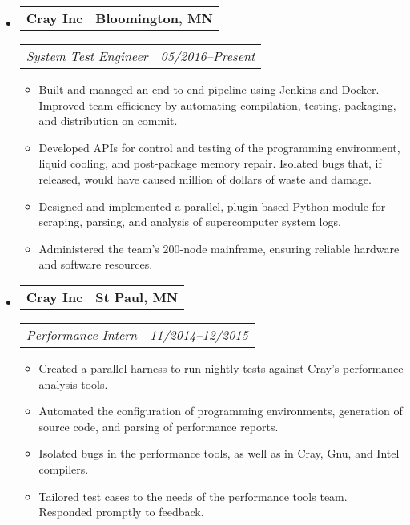 \documentclass[11pt,letterpaper]{article}
\makeatletter
\newcommand{\headerrow}[2]{
    \begin{tabular*}{\linewidth}{l@{ \extracolsep{\fill} }r} #1 & #2
    \end{tabular*}
}
\newcommand{\YearRange}[2]{#1--#2}
\makeatother
\begin{document}
\begin{itemize}[leftmargin=\parindent]
    \parskip=0.1em
    \itemsep=1.5em

    \item[]
        \headerrow{ \textbf{Cray Inc} }{ \textbf{Bloomington, MN} }
        \headerrow
            { \emph{System Test Engineer} }
            { \emph{ \YearRange{05/2016}{Present} } }
        \begin{itemize}
            \item Built and managed an end-to-end pipeline using Jenkins and Docker. Improved team efficiency by automating compilation, testing, packaging, and distribution on commit.
            \item Developed APIs for control and testing of the programming environment, liquid cooling, and post-package memory repair. Isolated bugs that, if released, would have caused million of dollars of waste and damage.
            \item Designed and implemented a parallel, plugin-based Python module for scraping, parsing, and analysis of supercomputer system logs.
            \item Administered the team's 200-node mainframe, ensuring reliable hardware and software resources.
        \end{itemize}

    \item[]
        \headerrow{ \textbf{Cray Inc} }{ \textbf{St Paul, MN} }
        \headerrow
            { \emph{Performance Intern} }
            { \emph{ \YearRange{11/2014}{12/2015} } }
        \begin{itemize}
            \item Created a parallel harness to run nightly tests against Cray's performance analysis tools.
            \item Automated the configuration of programming environments, generation of source code, and parsing of performance reports.
            \item Isolated bugs in the performance tools, as well as in Cray, Gnu, and Intel compilers.
            \item Tailored test cases to the needs of the performance tools team. Responded promptly to feedback.
        \end{itemize}


\end{itemize}
\end{document}
